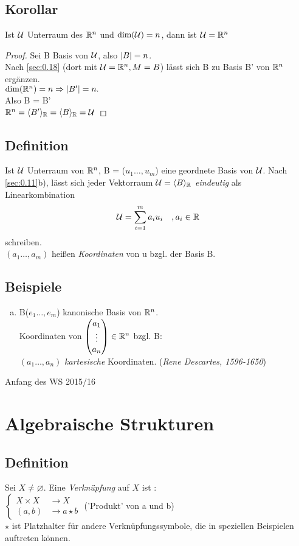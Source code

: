 \subsection{Korollar}
Ist $\mathcal{U}$ Unterraum des $\mathbb{R}^n$ und $\dim(\mathcal{U}) = n$, dann ist $\mathcal{U} = \mathbb{R}^n$
\begin{proof}
Sei B Basis von $\mathcal{U}$, also $\lvert B \rvert = n$.\\
Nach \ref{sec:0.18} (dort mit $\mathcal{U} = \mathbb{R}^n, M = B$) lässt sich B zu Basis B' von $\mathbb{R}^n$ ergänzen.\\
$\dim(\mathbb{R}^n) = n \Rightarrow \lvert B' \rvert = n.$\\
Also B = B'\\
$\mathbb{R}^n = \langle B'\rangle_{\mathbb{R}} = \langle B \rangle_{\mathbb{R}} = \mathcal{U}$
\end{proof}
\subsection{Definition}
Ist $\mathcal{U}$ Unterraum von $\mathbb{R}^n$, B = ($u_1\ldots,u_m$) eine geordnete Basis von $\mathcal{U}$. Nach \ref{sec:0.11}b), lässt sich jeder Vektorraum $\mathcal{U} = \langle B\rangle_{\mathbb{R}}$ \emph{eindeutig} als Linearkombination \[ \mathcal{U} = \sum_{i=1}^{m} a_iu_i\quad,a_i \in \mathbb{R} \] schreiben.\\
$(a_1\ldots,a_m)$ hei\ss en \emph{Koordinaten} von u bzgl. der Basis B.
\subsection{Beispiele}
\begin{enumerate}[a)]
\item B($e_1\ldots,e_m$) kanonische Basis von $\mathbb{R}^n$.\\
Koordinaten von $\begin{pmatrix} a_1\\\vdots\\a_n \end{pmatrix} \in \mathbb{R}^n$ bzgl. B:\\
$(a_1\ldots,a_n)$ \emph{kartesische} Koordinaten. \hfill (\emph{Rene Descartes, 1596-1650}) 
\end{enumerate}
\newpage
\begin{center}
\Huge Anfang des WS 2015/16
\end{center}\section{Algebraische Strukturen}
\subsection{Definition}\label{sec:1.1}
Sei $X \neq \varnothing$. Eine \emph{Verknüpfung} auf $X$ ist : \\ $\begin{cases}
X \times X &\longrightarrow X\\
(a,b) &\longrightarrow a \star b
\end{cases}$ ('Produkt' von a und b)\\
$\star$ ist Platzhalter für andere Verknüpfungssymbole, die in speziellen Beispielen auftreten können.
